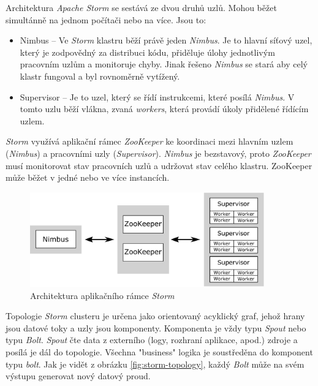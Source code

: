 \documentclass[
  digital, %
  table,   %
  nolof,     %
  nolot,     %
  oneside, %
  nocover,
  monochrome,
  12pt
]{fithesis3}
\begin{document}
Architektura \textit{Apache Storm} se sestává ze dvou druhů uzlů. Mohou běžet simultánně na jednom počítači nebo na více. Jsou to:

\begin{itemize}
\item Nimbus -- Ve \textit{Storm} klastru běží právě jeden \textit{Nimbus}. Je to hlavní síťový uzel, který je zodpovědný za distribuci kódu, přiděluje úlohy jednotlivým pracovním uzlům a monitoruje chyby. Jinak řešeno \textit{Nimbus} se stará aby celý klastr fungoval a byl rovnoměrně vytížený.
\item Supervisor -- Je to uzel, který se řídí instrukcemi, které posílá \textit{Nimbus}. V tomto uzlu běží vlákna, zvaná \textit{workers}, která provádí úkoly přidělené řídícím uzlem.
\end{itemize}

\textit{Storm} využívá aplikační rámec \textit{ZooKeeper} ke koordinaci mezi hlavním uzlem (\textit{Nimbus}) a pracovními uzly (\textit{Supervisor}). \textit{Nimbus} je bezstavový, proto \textit{ZooKeeper} musí monitorovat stav pracovních uzlů a udržovat stav celého klastru. ZooKeeper může běžet v jedné nebo ve více instancích.

\begin{figure}[H]
	\centering
    \includegraphics[width=0.9\textwidth, height=0.25\textheight]{images/storm-architecture.eps}
    \caption{Architektura aplikačního rámce \textit{Storm}}
    \label{fig:storm-architecture}
\end{figure}

Topologie \textit{Storm} clusteru je určena jako orientovaný acyklický graf, jehož hrany jsou datové toky a uzly jsou komponenty. Komponenta je vždy typu \textit{Spout} nebo typu \textit{Bolt}. \textit{Spout} čte data z externího (logy, rozhraní aplikace, apod.) zdroje a posílá je dál do topologie. Všechna "business" logika je soustředěna do komponent typu \textit{bolt}. Jak je vidět z obrázku \ref{fig:storm-topology}, každý \textit{Bolt} může na svém výstupu generovat nový datový proud.
\end{document}
